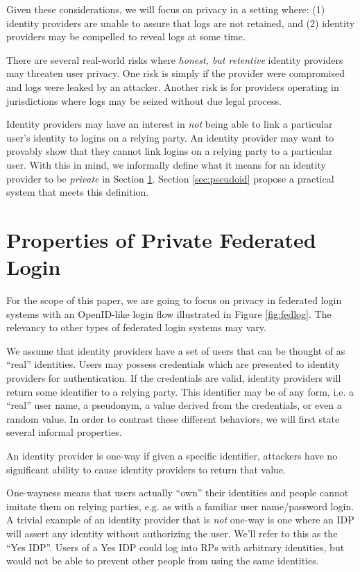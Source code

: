 \documentclass{llncs}
\begin{document}
Given these considerations, we will focus on privacy in a setting where:
(1) identity providers are unable to assure that logs are not retained, and
(2) identity providers may be compelled to reveal logs at some time.

There are several real-world risks where \emph{honest, but retentive}
identity providers may threaten user privacy. One risk is simply if
the provider were compromised and logs were leaked by an
attacker. Another risk is for providers operating in jurisdictions
where logs may be seized without due legal process. 

Identity providers may have an interest in \emph{not} being able to
link a particular user's identity to logins on a relying party. An
identity provider may want to provably show that they cannot link
logins on a relying party to a particular user. With this in mind, we
informally define what it means for an identity provider to be
\emph{private} in Section \ref{sec:private-fed-login}. Section
\ref{sec:pseudoid} propose a practical system that meets this
definition.

\section{Properties of Private Federated Login}
\label{sec:private-fed-login}

For the scope of this paper, we are going to focus on privacy in
federated login systems with an OpenID-like login flow illustrated in
Figure \ref{fig:fedlog}. The relevancy to other types of federated
login systems may vary. 

We assume that identity providers have a set of users that can be
thought of as ``real'' identities. Users may possess credentials which
are presented to identity providers for authentication. If the credentials
are valid, identity providers will return some identifier to a relying
party. This identifier may be of any form, i.e. a ``real'' user name, a
pseudonym, a value derived from the credentials, or even a random
value. In order to contrast these different behaviors, we will first
state several informal properties.

\begin{definition}
\label{def:ownership}
An identity provider is one-way if given a specific identifier,
attackers have no significant ability to cause identity providers to
return that value.
\end{definition}

One-wayness means that users actually ``own'' their identities and
people cannot imitate them on relying parties, e.g. as with a familiar
user name/password login. A trivial example of an identity provider
that is \textit{not} one-way is one where an IDP will assert any
identity without authorizing the user.  We'll refer to this as the
``Yes IDP''. Users of a Yes IDP could log into RPs with arbitrary
identities, but would not be able to prevent other people from using
the same identities.
\end{document}
